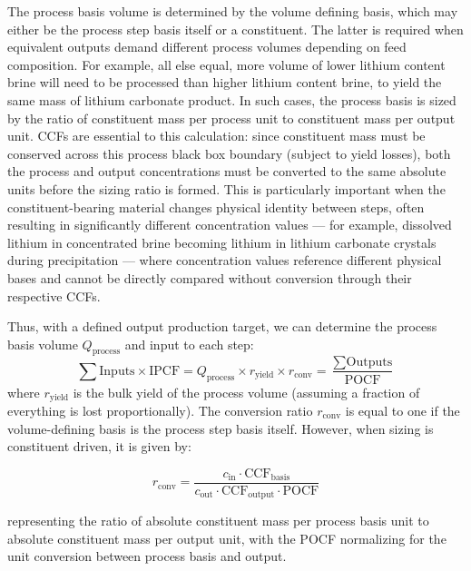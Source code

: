 \documentclass{article}
\renewcommand\_{\textunderscore\allowbreak}
\newcommand{\alteq}[1]{}
\newcommand{\alteqend}{}
\begin{document}
The process basis volume is determined by the volume defining basis, which may either be the process step basis itself or a constituent. The latter is required when equivalent outputs demand different process volumes depending on feed composition. For example, all else equal, more volume of lower lithium content brine will need to be processed than higher lithium content brine, to yield the same mass of lithium carbonate product. In such cases, the process basis is sized by the ratio of constituent mass per process unit to constituent mass per output unit. CCFs are essential to this calculation: since constituent mass must be conserved across this process black box boundary (subject to yield losses), both the process and output concentrations must be converted to the same absolute units before the sizing ratio is formed. This is particularly important when the constituent-bearing material changes physical identity between steps, often resulting in significantly different concentration values --- for example, dissolved lithium in concentrated brine becoming lithium in lithium carbonate crystals during precipitation --- where concentration values reference different physical bases and cannot be directly compared without conversion through their respective CCFs. 

Thus, with a defined output production target, we can determine the process basis volume $Q_{\text{process}}$ and input to each step:
\begin{equation}
    \sum \text{Inputs} \times \text{IPCF} = Q_{\text{process}} \times r_{\text{yield}} 
    \times r_{\text{conv}} = \frac{\sum \text{Outputs}}{\text{POCF}}
\end{equation}
where $r_{\text{yield}}$ is the bulk yield of the process volume (assuming a fraction of everything is lost proportionally). The conversion ratio $r_{\text{conv}}$ is equal to one if the volume-defining basis is the process step basis itself. However, when sizing is constituent driven, it is given by:
\alteq{Conversion ratio r-conv equals c-in times the basis capacity conversion factor, divided by c-out times the output capacity conversion factor times the process operating capacity factor.}
\begin{equation}
    r_{\text{conv}} = \frac{c_{\text{in}} \cdot \text{CCF}_{\text{basis}}}{c_{\text{out}} \cdot \text{CCF}_{\text{output}} \cdot \text{POCF}}
\end{equation}
\alteqend
representing the ratio of absolute constituent mass per process basis unit to absolute constituent mass per output unit, with the POCF normalizing for the unit conversion between process basis and output. 
\end{document}
